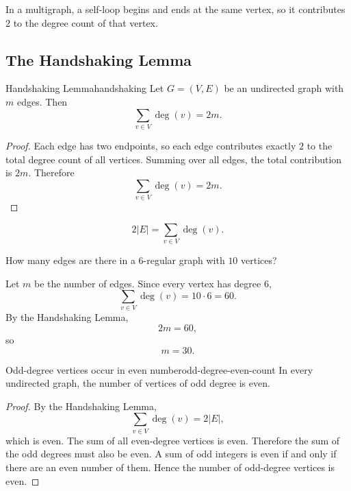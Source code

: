 \begin{commonmistake}[title={A loop contributes two, not one}]
In a multigraph, a self-loop begins and ends at the same vertex, so it contributes \(2\) to the degree count of that vertex.
\end{commonmistake}

\subsection{The Handshaking Lemma}

\begin{theorem}{Handshaking Lemma}{handshaking}
Let \(G=(V,E)\) be an undirected graph with \(m\) edges. Then
\[
\sum_{v\in V}\deg(v)=2m.
\]
\end{theorem}

\begin{proof}
Each edge has two endpoints, so each edge contributes exactly \(2\) to the total degree count of all vertices. Summing over all edges, the total contribution is \(2m\). Therefore
\[
\sum_{v\in V}\deg(v)=2m.
\]
\end{proof}

\begin{keyformula}[title={Handshaking Lemma}]
\[
2|E|=\sum_{v\in V}\deg(v).
\]
\end{keyformula}

\begin{examplebox}[title={Example 3 from the handout}]
How many edges are there in a \(6\)-regular graph with \(10\) vertices?

Let \(m\) be the number of edges. Since every vertex has degree \(6\),
\[
\sum_{v\in V}\deg(v)=10\cdot 6=60.
\]
By the Handshaking Lemma,
\[
2m=60,
\]
so
\[
\boxed{m=30.}
\]
\end{examplebox}

\begin{theorem}{Odd-degree vertices occur in even number}{odd-degree-even-count}
In every undirected graph, the number of vertices of odd degree is even.
\end{theorem}

\begin{proof}
By the Handshaking Lemma,
\[
\sum_{v\in V}\deg(v)=2|E|,
\]
which is even. The sum of all even-degree vertices is even. Therefore the sum of the odd degrees must also be even. A sum of odd integers is even if and only if there are an even number of them. Hence the number of odd-degree vertices is even.
\end{proof}

